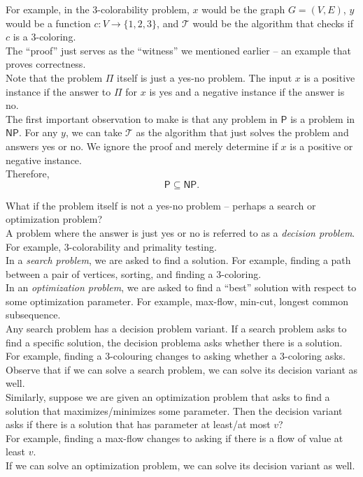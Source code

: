 For example, in the $3$-colorability problem, $x$ would be the graph $G=(V,E)$, $y$ would be a function $c:V\to\{1,2,3\}$, and $\mathcal{T}$ would be the algorithm that checks if $c$ is a $3$-coloring.\\
The ``proof'' just serves as the ``witness'' we mentioned earlier -- an example that proves correctness.\\

Note that the problem $\Pi$ itself is just a yes-no problem. The input $x$ is a positive instance if the answer to $\Pi$ for $x$ is yes and a negative instance if the answer is no.\\

The first important observation to make is that any problem in $\mathsf{P}$ is a problem in $\mathsf{NP}$. For any $y$, we can take $\mathcal{T}$ as the algorithm that just solves the problem and answers yes or no. We ignore the proof and merely determine if $x$ is a positive or negative instance.\\
Therefore,
\[ \mathsf{P} \subseteq \mathsf{NP}. \]

What if the problem itself is not a yes-no problem -- perhaps a search or optimization problem?\\
A problem where the answer is just yes or no is referred to as a \textit{decision problem}. For example, $3$-colorability and primality testing.\\
In a \textit{search problem}, we are asked to find a solution. For example, finding a path between a pair of vertices, sorting, and finding a $3$-coloring.\\
In an \textit{optimization problem}, we are asked to find a ``best'' solution with respect to some optimization parameter. For example, max-flow, min-cut, longest common subsequence.\\

Any search problem has a decision problem variant. If a search problem asks to find a specific solution, the decision problema asks whether there is a solution.\\
For example, finding a $3$-colouring changes to asking whether a $3$-coloring asks.\\
Observe that if we can solve a search problem, we can solve its decision variant as well.\\

Similarly, suppose we are given an optimization problem that asks to find a solution that maximizes/minimizes some parameter. Then the decision variant asks if there is a solution that has parameter at least/at most $v$?\\
For example, finding a max-flow changes to asking if there is a flow of value at least $v$.\\
If we can solve an optimization problem, we can solve its decision variant as well.\\

